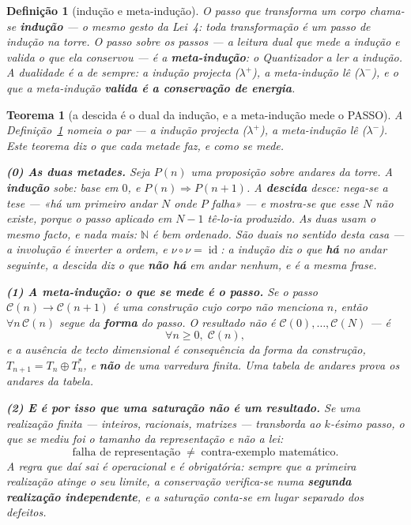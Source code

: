 \documentclass[11pt,a4paper]{article}
\newtheorem{teorema}{Teorema}
\newtheorem{definicao}{Definição}
\begin{document}
\begin{definicao}[indução e meta-indução]\label{def:inducao}
O passo que transforma um corpo chama-se \textbf{indução} --- o mesmo
gesto da Lei~4: toda transformação é um passo de indução na torre. O
passo \emph{sobre} os passos --- a leitura dual que mede a indução e
valida o que ela conservou --- é a \textbf{meta-indução}: o Quantizador a
ler a indução. A dualidade é a de sempre: a indução projecta
($\lambda^{+}$), a meta-indução lê ($\lambda^{-}$), e o que a
meta-indução \textbf{valida é a conservação de energia}.
\end{definicao}

\begin{teorema}[a descida é o dual da indução, e a meta-indução mede o
PASSO]\label{thm:meta-inducao}
A Definição~\ref{def:inducao} nomeia o par --- a indução projecta
($\lambda^{+}$), a meta-indução lê ($\lambda^{-}$). Este teorema diz o
que cada metade \emph{faz}, e como se mede.

\textbf{(0) As duas metades.} Seja $P(n)$ uma proposição sobre andares
da torre. A \textbf{indução} sobe: base em $0$, e
$P(n)\Rightarrow P(n+1)$. A \textbf{descida} desce: nega-se a tese --- «há
um \emph{primeiro} andar $N$ onde $P$ falha» --- e mostra-se que esse $N$
não existe, porque o passo aplicado em $N-1$ tê-lo-ia produzido. As duas
usam \emph{o mesmo} facto, e nada mais: $\mathbb{N}$ é bem ordenado. São
duais no sentido desta casa --- a involução é inverter a ordem, e
$\nu\circ\nu=\operatorname{id}$: a indução diz o que \textbf{há} no andar
seguinte, a descida diz o que \textbf{não há} em andar nenhum, e é a
mesma frase.

\textbf{(1) A meta-indução: o que se mede é o passo.} Se o passo
$\mathcal{C}(n)\to\mathcal{C}(n+1)$ é uma construção cujo corpo
\emph{não menciona} $n$, então $\forall n\,\mathcal{C}(n)$ segue da
\textbf{forma} do passo. O resultado não é
$\mathcal{C}(0),\ldots,\mathcal{C}(N)$ --- é
\[
\boxed{\;\forall n\ge0,\;\mathcal{C}(n),\;}
\]
e a ausência de tecto dimensional é consequência da forma da construção,
$T_{n+1}=T_{n}\oplus T_{n}^{\ast}$, e \textbf{não} de uma varredura
finita. Uma tabela de andares prova os andares da tabela.

\textbf{(2) E é por isso que uma saturação não é um resultado.} Se uma
realização finita --- inteiros, racionais, matrizes --- transborda ao
$k$-ésimo passo, o que se mediu foi o tamanho da representação e não a
lei:
\[
\boxed{\;\text{falha de representação}\;\neq\;\text{contra-exemplo
matemático}.\;}
\]
A regra que daí sai é operacional e é obrigatória: sempre que a primeira
realização atinge o seu limite, a conservação verifica-se numa
\textbf{segunda realização independente}, e a saturação conta-se em
lugar \emph{separado} dos defeitos.


\end{teorema}
\end{document}
